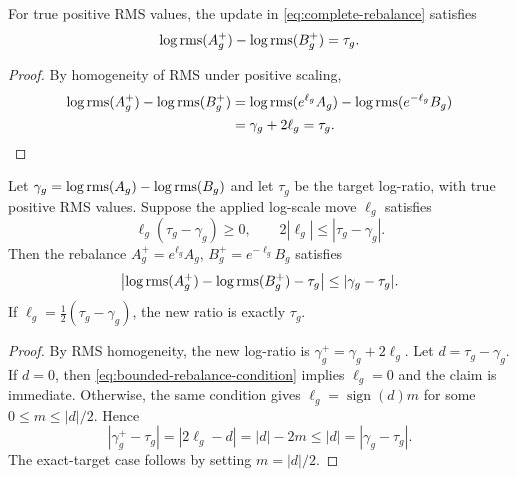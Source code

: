 \begin{lemma}
\label{lem:complete-targeting}
For true positive RMS values, the update in \eqref{eq:complete-rebalance} satisfies
\begin{equation}
    \log\operatorname{rms}(A_g^+)-\log\operatorname{rms}(B_g^+)=\tau_g .
\end{equation}
\end{lemma}

\begin{proof}
By homogeneity of RMS under positive scaling,
\begin{align}
    \log\operatorname{rms}(A_g^+)-\log\operatorname{rms}(B_g^+)
    &=\log\operatorname{rms}(e^{\ell_g}A_g)-\log\operatorname{rms}(e^{-\ell_g}B_g) \\
    &=\gamma_g+2\ell_g
      =\tau_g .
\end{align}
\end{proof}

\begin{lemma}
\label{lem:bounded-rebalance-target}
Let $\gamma_g=\log\operatorname{rms}(A_g)-\log\operatorname{rms}(B_g)$ and let $\tau_g$ be the target log-ratio,
with true positive RMS values.  Suppose the applied log-scale move $\ell_g$ satisfies
\begin{equation}
    \ell_g(\tau_g-\gamma_g)\geq0,
    \qquad
    2|\ell_g|\leq |\tau_g-\gamma_g| .
    \label{eq:bounded-rebalance-condition}
\end{equation}
Then the rebalance $A_g^+=e^{\ell_g}A_g$, $B_g^+=e^{-\ell_g}B_g$ satisfies
\begin{equation}
    \left|\log\operatorname{rms}(A_g^+)-\log\operatorname{rms}(B_g^+)-\tau_g\right|
    \leq
    |\gamma_g-\tau_g| .
    \label{eq:bounded-rebalance-nonexpansive}
\end{equation}
If $\ell_g=\frac{1}{2}(\tau_g-\gamma_g)$, the new ratio is exactly $\tau_g$.
\end{lemma}

\begin{proof}
By RMS homogeneity, the new log-ratio is $\gamma_g^+=\gamma_g+2\ell_g$.  Let
$d=\tau_g-\gamma_g$.  If $d=0$, then \eqref{eq:bounded-rebalance-condition} implies
$\ell_g=0$ and the claim is immediate.  Otherwise, the same condition gives
$\ell_g=\operatorname{sign}(d)m$ for some $0\leq m\leq |d|/2$.  Hence
\begin{equation}
    |\gamma_g^+-\tau_g|=|2\ell_g-d|=|d|-2m\leq |d|=|\gamma_g-\tau_g|.
\end{equation}
The exact-target case follows by setting $m=|d|/2$.
\end{proof}

